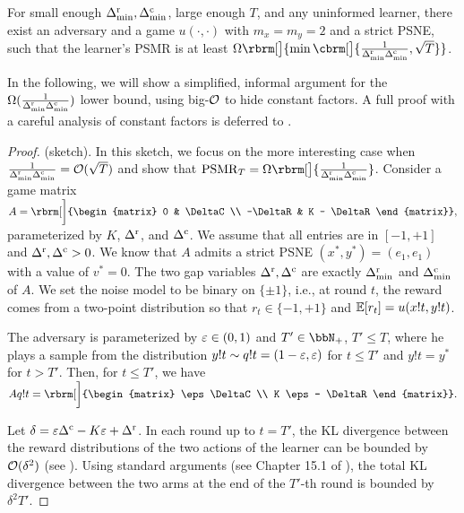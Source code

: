 \begin{theorem}\label{thm:uninformed-lb}
    For small enough $\Delta^{\mathrm{r}}_{\mathrm{min}}, \Delta^{\mathrm{c}}_{\mathrm{min}}$, large enough $T$, and any uninformed learner, there exist an adversary and a game $u(\cdot, \cdot)$ with $m_x=m_y=2$ and a strict PSNE, such that the learner's PSMR is at least $\Omega\rbrm[\big]{\min\cbrm[\big]{\frac{1}{\DRmin\DCmin},\sqrt{T}}}$.
\end{theorem}

In the following, we will show a simplified, informal argument for the $\Omega(\frac{1}{\Delta^{\mathrm{r}}_{\mathrm{min}}\Delta^{\mathrm{c}}_{\mathrm{min}}})$ lower bound, using big-$\mathcal{O}$ to hide constant factors. A full proof with a careful analysis of constant factors is deferred to . \\

\begin{proof}(sketch).
    In this sketch, we focus on the more interesting case when $\frac{1}{\Delta^{\mathrm{r}}_{\mathrm{min}}\Delta^{\mathrm{c}}_{\mathrm{min}}}=\mathcal{O}(\sqrt T)$ and show that $\psmr_T = \Omega\rbrm[\big]{\frac{1}{\DRmin\DCmin}}$.
    Consider a game matrix
    $
        A=\rbrm[\bigg]{\begin{matrix}
            0 &        \DeltaC \\ 
            -\DeltaR & K - \DeltaR 
          \end{matrix}},
    $
    parameterized by $K$, $\Delta^{\mathrm{r}}$, and $\Delta^{\mathrm{c}}$. We assume that all entries are in $[-1, +1]$ and $\Delta^{\mathrm{r}}, \Delta^{\mathrm{c}}>0$. We know that $A$ admits a strict PSNE $(x^*,y^*)=(e_1,e_1)$ with a value of $v^*=0$. The two gap variables $\Delta^{\mathrm{r}},\Delta^{\mathrm{c}}$ are exactly $\Delta^{\mathrm{r}}_{\mathrm{min}}$ and $\Delta^{\mathrm{c}}_{\mathrm{min}}$ of $A$. We set the noise model to be binary on $\{\pm 1\}$, i.e., at round $t$, the reward comes from a two-point distribution so that $r_t\in \{-1,+1\}$ and $\mathbb{E}[r_t]=u(x!t,y!t)$.
    
    The adversary is parameterized by $\varepsilon\in (0,1)$ and $T'\in \bbN_+$, $T'\leq T$, where he plays a sample from the distribution $y!t\sim q!t=(1-\varepsilon,\varepsilon)$ for $t\leq T'$ and $y!t=y^*$ for $t>T'$. Then, for $t\leq T'$, we have
    $
        A q!t = \rbrm[\bigg]{\begin{matrix}
            \eps \DeltaC\\
            K \eps - \DeltaR
        \end{matrix}}.
    $

    Let $\delta=\varepsilon\Delta^{\mathrm{c}}-K \varepsilon+\Delta^{\mathrm{r}}$. In each round up to $t=T'$, the KL divergence between the reward distributions of the two actions of the learner can be bounded by $\mathcal{O}(\delta^2)$ (see ). Using standard arguments (see Chapter 15.1 of \citet{lattimore2020bandit}), the total KL divergence between the two arms at the end of the $T'$-th round is bounded by $\delta^2T'$. 


\end{proof}
